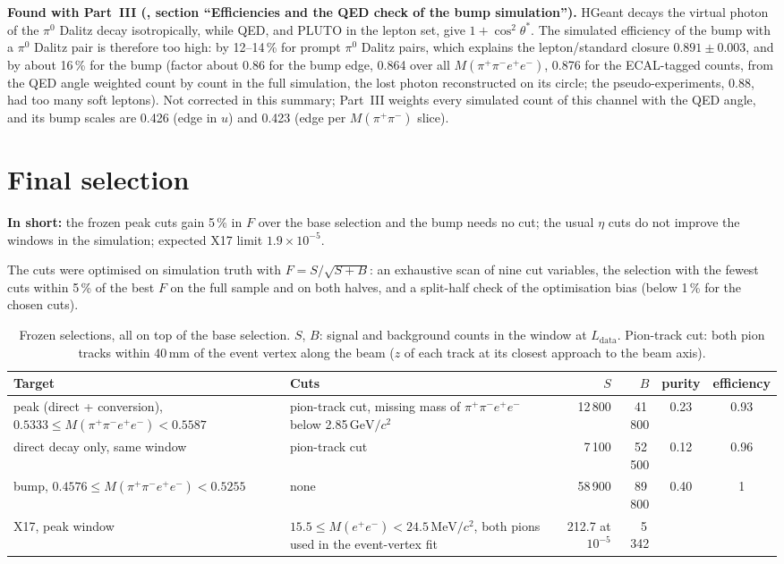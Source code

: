 \documentclass[11pt,a4paper]{article}
\newcommand{\piz}{\ensuremath{\pi^{0}}\xspace}
\newcommand{\ppee}{\ensuremath{\pi^{+}\pi^{-}e^{+}e^{-}}\xspace}
\newcommand{\Mfour}{\ensuremath{M(\pi^{+}\pi^{-}e^{+}e^{-})}\xspace}
\newcommand{\Mee}{\ensuremath{M(e^{+}e^{-})}\xspace}
\newcommand{\Mpipi}{\ensuremath{M(\pi^{+}\pi^{-})}\xspace}
\newcommand{\GeVcc}{\ensuremath{\mathrm{GeV}/c^{2}}\xspace}
\newcommand{\MeVcc}{\ensuremath{\mathrm{MeV}/c^{2}}\xspace}
\newcommand{\Ldata}{\ensuremath{L_{\mathrm{data}}}\xspace}
\newcommand{\code}[1]{\texttt{\detokenize{#1}}}
\newcommand{\notebox}[1]{\par\noindent\colorbox{orange!10}{\parbox{\dimexpr\linewidth-2\fboxsep\relax}{#1}}\par}
\newcommand{\inshort}[1]{\par\noindent\colorbox{black!5}{\parbox{\dimexpr\linewidth-2\fboxsep\relax}{\textbf{In short:} #1}}\par}
\begin{document}
\notebox{\textbf{Found with Part~III (\code{report_all.pdf}, section ``Efficiencies and the QED check of the
bump simulation'').} HGeant decays the virtual photon of the \piz Dalitz decay isotropically, while QED, and PLUTO
in the lepton set, give $1+\cos^2\theta^*$. The simulated efficiency of the bump with a \piz Dalitz pair is
therefore too high: by 12--14\,\% for prompt \piz Dalitz pairs, which explains the lepton/standard closure
$0.891\pm0.003$, and by about 16\,\% for the bump (factor about 0.86 for the bump edge, 0.864 over all \Mfour, 0.876 for the
ECAL-tagged counts, from the QED angle weighted count by count in the full simulation, the lost photon reconstructed on
its circle; the pseudo-experiments, 0.88, had too many soft leptons). Not corrected in this summary; Part~III weights every
simulated count of this channel with the QED angle, and its bump scales are 0.426 (edge in $u$) and 0.423 (edge per \Mpipi
slice).}

\section{Final selection}
\label{sec:sel}
\inshort{the frozen peak cuts gain 5\,\% in $F$ over the base selection and the bump needs no cut; the usual $\eta$ cuts
do not improve the windows in the simulation; expected X17 limit $1.9\times10^{-5}$.}
The cuts were optimised on simulation truth with $F = S/\sqrt{S+B}$: an exhaustive scan of nine cut variables, the
selection with the fewest cuts within 5\,\% of the best $F$ on the full sample and on both halves, and a split-half check of
the optimisation bias (below 1\,\% for the chosen cuts).

\begin{table}[!htb]
\centering
\caption{Frozen selections, all on top of the base selection. $S$, $B$: signal and background counts in the window at
\Ldata. Pion-track cut: both pion tracks within 40\,mm of the event vertex along the beam ($z$ of each track at its closest
approach to the beam axis).}
\label{tab:sel}
\small
\setlength{\tabcolsep}{4pt}
\begin{tabularx}{\textwidth}{@{}>{\raggedright\arraybackslash}p{4.3cm} L r r c c@{}}
\toprule
Target & Cuts & $S$ & $B$ & purity & efficiency \\
\midrule
peak (direct + conversion), $0.5333\le\Mfour<0.5587$ & pion-track cut, missing mass of \ppee below 2.85\,\GeVcc & 12\,800 & 41\,800 & 0.23 & 0.93 \\
direct decay only, same window & pion-track cut & 7\,100 & 52\,500 & 0.12 & 0.96 \\
bump, $0.4576\le\Mfour<0.5255$ & none & 58\,900 & 89\,800 & 0.40 & 1 \\
X17, peak window & $15.5\le\Mee<24.5$\,\MeVcc, both pions used in the event-vertex fit & 212.7 at $10^{-5}$ & 5\,342 & & \\
\bottomrule
\end{tabularx}
\end{table}
\end{document}
